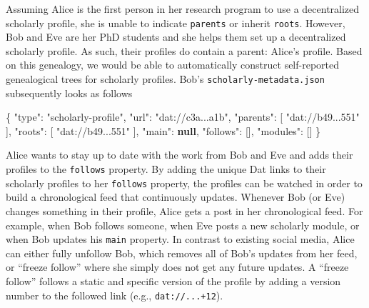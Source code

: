 \documentclass[publications,article,submit,moreauthors,pdftex,10pt,a4paper]{Definitions/mdpi}
\newenvironment{Shaded}{\begin{snugshade}}{\end{snugshade}}
\newcommand{\DataTypeTok}[1]{\textcolor[rgb]{0.13,0.29,0.53}{#1}}
\newcommand{\FunctionTok}[1]{\textcolor[rgb]{0.00,0.00,0.00}{#1}}
\newcommand{\KeywordTok}[1]{\textcolor[rgb]{0.13,0.29,0.53}{\textbf{#1}}}
\newcommand{\OtherTok}[1]{\textcolor[rgb]{0.56,0.35,0.01}{#1}}
\newcommand{\StringTok}[1]{\textcolor[rgb]{0.31,0.60,0.02}{#1}}
\begin{document}
Assuming Alice is the first person in her research program to use a
decentralized scholarly profile, she is unable to indicate
\texttt{parents} or inherit \texttt{roots}. However, Bob and Eve are her
PhD students and she helps them set up a decentralized scholarly
profile. As such, their profiles do contain a parent: Alice's profile.
Based on this genealogy, we would be able to automatically construct
self-reported genealogical trees for scholarly profiles. Bob's
\texttt{scholarly-metadata.json} subsequently looks as follows

\begin{Shaded}
\begin{Highlighting}[]
\FunctionTok{\{}
  \DataTypeTok{"type"}\FunctionTok{:} \StringTok{"scholarly-profile"}\FunctionTok{,}
  \DataTypeTok{"url"}\FunctionTok{:} \StringTok{"dat://c3a...a1b"}\FunctionTok{,}
  \DataTypeTok{"parents"}\FunctionTok{:} \OtherTok{[} \StringTok{"dat://b49...551"} \OtherTok{]}\FunctionTok{,}
  \DataTypeTok{"roots"}\FunctionTok{:} \OtherTok{[} \StringTok{"dat://b49...551"} \OtherTok{]}\FunctionTok{,}
  \DataTypeTok{"main"}\FunctionTok{:} \KeywordTok{null}\FunctionTok{,}
  \DataTypeTok{"follows"}\FunctionTok{:} \OtherTok{[]}\FunctionTok{,}
  \DataTypeTok{"modules"}\FunctionTok{:} \OtherTok{[]}
\FunctionTok{\}}
\end{Highlighting}
\end{Shaded}

Alice wants to stay up to date with the work from Bob and Eve and adds
their profiles to the \texttt{follows} property. By adding the unique
Dat links to their scholarly profiles to her \texttt{follows} property,
the profiles can be watched in order to build a chronological feed that
continuously updates. Whenever Bob (or Eve) changes something in their
profile, Alice gets a post in her chronological feed. For example, when
Bob follows someone, when Eve posts a new scholarly module, or when Bob
updates his \texttt{main} property. In contrast to existing social
media, Alice can either fully unfollow Bob, which removes all of Bob's
updates from her feed, or ``freeze follow'' where she simply does not
get any future updates. A ``freeze follow'' follows a static and
specific version of the profile by adding a version number to the
followed link (e.g., \texttt{dat://...+12}).
\end{document}
